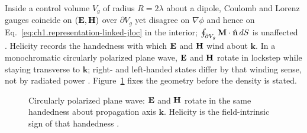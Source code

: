 Inside a control volume $V_g$ of radius $R=2\lambda$ about a dipole, Coulomb and Lorenz gauges coincide on $(\mathbf{E},\mathbf{H})$ over $\partial V_g$ yet disagree on $\nabla\phi$ and hence on Eq.~\eqref{eq:ch1.representation-linked-jloc} in the interior; $\oint_{\partial V_g}\mathbf{M}\cdot\hat{\mathbf{n}}\,dS$ is unaffected \cite{belinfante1940,stratton1941}. Helicity records the handedness with which $\mathbf{E}$ and $\mathbf{H}$ wind about $\mathbf{k}$. In a monochromatic circularly polarized plane wave, $\mathbf{E}$ and $\mathbf{H}$ rotate in lockstep while staying transverse to $\mathbf{k}$; right- and left-handed states differ by that winding sense, not by radiated power \cite{stratton1941}. Figure~\ref{fig:ch1.helicity-cp-wave} fixes the geometry before the density is stated.


\begin{figure}[t]
\centering
{}
\caption{Circularly polarized plane wave: $\mathbf{E}$ and $\mathbf{H}$ rotate in the same handedness about propagation axis $\mathbf{k}$. Helicity is the field-intrinsic sign of that handedness \cite{stratton1941,belinfante1940}.}
\label{fig:ch1.helicity-cp-wave}
\end{figure}

